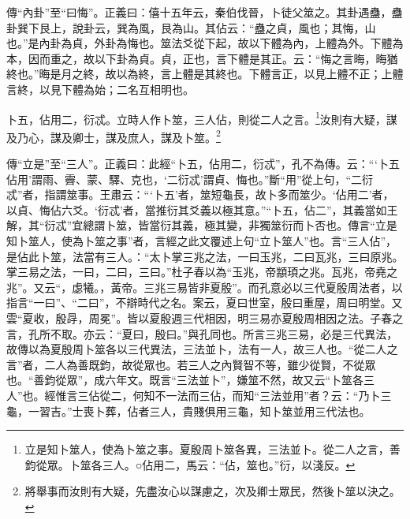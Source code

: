{\noindent\zhuan{}\fzbyks 傳“內卦”至“曰悔”。正義曰：僖十五年云，秦伯伐晉，卜徒父筮之。其卦遇蠱，蠱卦巽下艮上，說卦云，巽為風，艮為山。其佔云：“蠱之貞，風也；其悔，山也。”是內卦為貞，外卦為悔也。筮法爻從下起，故以下體為內，上體為外。下體為本，因而重之，故以下卦為貞。貞，正也，言下體是其正。云：“悔之言晦，晦猶終也。”晦是月之終，故以為終，言上體是其終也。下體言正，以見上體不正；上體言終，以見下體為始；二名互相明也。 \par}

卜五，佔用二，衍忒。立時人作卜筮，三人佔，則從二人之言。\footnote{立是知卜筮人，使為卜筮之事。夏殷周卜筮各異，三法並卜。從二人之言，善鈞從眾。卜筮各三人。○佔用二，馬云：“佔，筮也。”衍，以淺反。}汝則有大疑，謀及乃心，謀及卿士，謀及庶人，謀及卜筮。\footnote{將舉事而汝則有大疑，先盡汝心以謀慮之，次及卿士眾民，然後卜筮以決之。}


{\noindent\zhuan{}\fzbyks 傳“立是”至“三人”。正義曰：此經“卜五，佔用二，衍忒”，孔不為傳。云：“‘卜五佔用’謂雨、霽、蒙、驛、克也，‘二衍忒’謂貞、悔也。”斷“用”從上句，“二衍忒”者，指謂筮事。王肅云：“‘卜五’者，筮短龜長，故卜多而筮少。‘佔用二’者，以貞、悔佔六爻。‘衍忒’者，當推衍其爻義以極其意。”“卜五，佔二”，其義當如王解，其“衍忒”宜總謂卜筮，皆當衍其義，極其變，非獨筮衍而卜否也。傳言“立是知卜筮人，使為卜筮之事”者，言經之此文覆述上句“立卜筮人”也。言“三人佔”，是佔此卜筮，法當有三人。：“太卜掌三兆之法，一曰玉兆，二曰瓦兆，三曰原兆。掌三易之法，一曰，二曰，三曰。”杜子春以為“玉兆，帝顓頊之兆。瓦兆，帝堯之兆”。又云“，虙犧。，黃帝。三兆三易皆非夏殷”。而孔意必以三代夏殷周法者，以指言“一曰”、“二曰”，不辯時代之名。案云，夏曰世室，殷曰重屋，周曰明堂。又雲“夏收，殷冔，周冕”。皆以夏殷週三代相因，明三易亦夏殷周相因之法。子春之言，孔所不取。亦云：“夏曰，殷曰。”與孔同也。所言三兆三易，必是三代異法，故傳以為夏殷周卜筮各以三代異法，三法並卜，法有一人，故三人也。“從二人之言”者，二人為善既鈞，故從眾也。若三人之內賢智不等，雖少從賢，不從眾也。“善鈞從眾”，成六年文。既言“三法並卜”，嫌筮不然，故又云“卜筮各三人”也。經惟言三佔從二，何知不一法而三佔，而知“三法並用”者？云：“乃卜三龜，一習吉。”士喪卜葬，佔者三人，貴賤俱用三龜，知卜筮並用三代法也。 \par}

